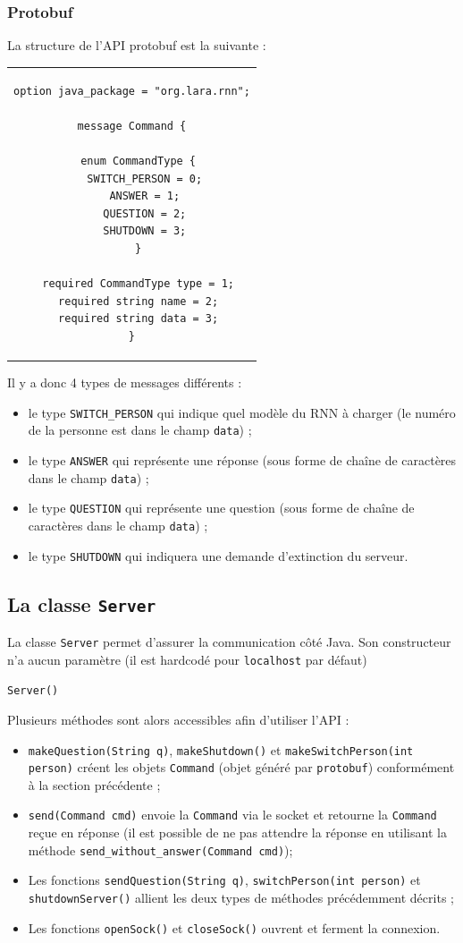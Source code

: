 \documentclass[10pt,a4paper]{article}
\begin{document}
\subsubsection{Protobuf}
La structure de l'API protobuf est la suivante :
\begin{center}
\begin{tabular}{c}
\begin{lstlisting}
option java_package = "org.lara.rnn";

message Command {

  enum CommandType {
    SWITCH_PERSON = 0;
    ANSWER = 1;
    QUESTION = 2;
    SHUTDOWN = 3;
  }

  required CommandType type = 1;
  required string name = 2;
  required string data = 3;
}
\end{lstlisting}
\end{tabular}
\end{center}
Il y a donc 4 types de messages différents :
\begin{itemize}
\item le type \texttt{SWITCH\_PERSON} qui indique quel modèle du RNN à charger (le numéro de la personne est dans le champ \texttt{data}) ;
\item le type \texttt{ANSWER} qui représente une réponse (sous forme de chaîne de caractères dans le champ \texttt{data}) ;
\item le type \texttt{QUESTION} qui représente une question (sous forme de chaîne de caractères dans le champ \texttt{data}) ;
\item le type \texttt{SHUTDOWN} qui indiquera une demande d'extinction du serveur.
\end{itemize}
\subsection{La classe \texttt{Server}}
La classe \texttt{Server} permet d'assurer la communication côté Java. Son constructeur n'a aucun paramètre (il est hardcodé pour \texttt{localhost} par défaut)
\begin{center}
\texttt{Server()}
\end{center}
Plusieurs méthodes sont alors accessibles afin d'utiliser l'API :
\begin{itemize}
\item \texttt{makeQuestion(String q)}, \texttt{makeShutdown()} et \texttt{makeSwitchPerson(int person)} créent les objets \texttt{Command} (objet généré par \texttt{protobuf}) conformément à la section précédente ;
\item \texttt{send(Command cmd)} envoie la \texttt{Command} via le socket et retourne la \texttt{Command} reçue en réponse (il est possible de ne pas attendre la réponse en utilisant la méthode \texttt{send\_without\_answer(Command cmd)});
\item Les fonctions \texttt{sendQuestion(String q)}, \texttt{switchPerson(int person)} et \texttt{shutdownServer()} allient les deux types de méthodes précédemment décrits ;
\item Les fonctions \texttt{openSock()} et \texttt{closeSock()} ouvrent et ferment la connexion. 
\end{itemize}
\end{document}
